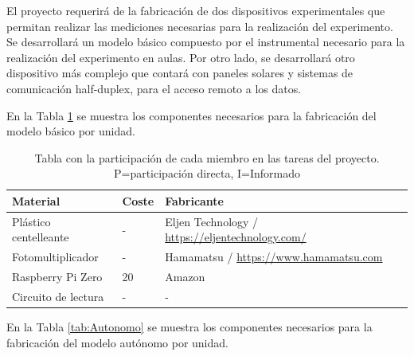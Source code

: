 \documentclass[11pt]{extarticle}
\begin{document}
				El proyecto requerirá de la fabricación de dos dispositivos experimentales que permitan realizar las mediciones necesarias para la realización del experimento. Se desarrollará un modelo básico compuesto por el instrumental necesario para la realización del experimento en aulas. Por otro lado, se desarrollará otro dispositivo más complejo que contará con paneles solares y sistemas de comunicación half-duplex, para el acceso remoto a los datos.

				En la Tabla \ref{tab:Basico} se muestra los componentes necesarios para la fabricación del modelo básico por unidad.

				\begin{table}[H]
					    \centering
						\begin{tabular}{m{3.5cm} m{1.0cm} m{5.4cm}}
							\hline
							\multicolumn{1}{m{3.5cm}}{\centering \textbf{Material}} &  
							\multicolumn{1}{m{1.0cm}}{\centering \textbf{Coste}} &
							\multicolumn{1}{m{5.4cm}}{\centering \textbf{Fabricante}} \\ \hline
						   	\hline
						   	Plástico centelleante	& -	&  Eljen Technology / \url{https://eljentechnology.com/} \\ \hline
						    Fotomultiplicador 		& - &	Hamamatsu / \url{https://www.hamamatsu.com}  \\ \hline
						    Raspberry Pi Zero		& 20 & Amazon \\ \hline
						    Circuito de lectura		& - & - \\ \hline
					    \end{tabular}
					    \caption{\label{tab:Basico} Tabla con la participación de cada miembro en las tareas del proyecto. P=participación directa, I=Informado}
					\end{table}

				En la Tabla \ref{tab:Autonomo} se muestra los componentes necesarios para la fabricación del modelo autónomo por unidad.
\end{document}
